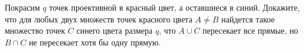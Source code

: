 Покрасим $q$ точек проективной в красный цвет, а оставшиеся в синий. Докажите, что для любых двух
множеств точек красного цвета $A \neq B$ найдется такое множество точек $C$ синего цвета размера $q$, что
$A \cup C$ пересекает все прямые, но $B \cap C$ не пересекает хотя бы одну прямую.
